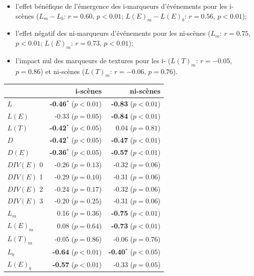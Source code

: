 \begin{itemize}
\item l'effet bénéfique de l'émergence des i-marqueurs d'événements pour les i-scènes ($L_m-L_b$: $r=0.60$, $p<0.01$; $L(E)_m-L(E)_b$: $r=0.56$, $p<0.01$);
\item l'effet négatif des ni-marqueurs d'événements pour les ni-scènes ($L_m$: $r=0.75$, $p<0.01$; $L(E)_m$: $r=0.73$, $p<0.01$);
\item l'impact nul des marqueurs de textures pour les i- ($L(T)_m$: $r=-0.05$, $p=0.86$) et ni-scènes ($L(T)_m$: $r=-0.06$, $p=0.76$).
\end{itemize}



\begin{table}[t]
\centering
\begin{tabular}{l r r} 
                   &   i-scènes                      & ni-scènes \\
\hline
$L$                & \textbf{-0.46$^{*}$} ($p<0.01$) & \textbf{-0.83} ($p<0.01$)\\
$L(E)$             & -0.33 ($p=0.05$)                & \textbf{-0.84} ($p<0.01$)\\
$L(T)$             & \textbf{-0.42$^{*}$} ($p<0.05$) &  0.04 ($p=0.81$) \\
$D$                & \textbf{-0.42$^{*}$} ($p<0.05$) & \textbf{-0.47} ($p<0.01$)\\
$D(E)$             & \textbf{-0.36$^{*}$} ($p<0.05$) & \textbf{-0.57} ($p<0.01$)\\
$DIV(E)$ 0         & -0.26 ($p=0.13$)                & -0.32 ($p=0.06$)\\
$DIV(E)$ 1         & -0.29 ($p=0.10$)                & -0.31 ($p=0.06$)\\
$DIV(E)$ 2         & -0.24 ($p=0.17$)                & -0.32 ($p=0.06$)\\
$DIV(E)$ 3         & -0.20 ($p=0.25$)                & -0.31 ($p=0.06$)\\
$L_m$              & 0.16  ($p=0.36$)                & \textbf{-0.75} ($p<0.01$) \\
$L(E)_m$           & 0.08  ($p=0.64$)                & \textbf{-0.73} ($p<0.01$) \\
$L(T)_m$           & -0.05 ($p=0.86$)                & -0.06 ($p=0.76$) \\
$L_b$              & \textbf{-0.64} ($p<0.01$)       & \textbf{-0.40$^{*}$} ($p<0.05$) \\
$L(E)_b$           & \textbf{-0.57} ($p<0.01$)       & -0.33 ($p=0.05$) \\

\end{tabular}
\end{table}
